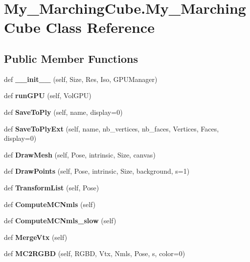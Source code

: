 \section{My\+\_\+\+Marching\+Cube.\+My\+\_\+\+Marching\+Cube Class Reference}
\label{class_my___marching_cube_1_1_my___marching_cube}
\subsection*{Public Member Functions}
\begin{DoxyCompactItemize}
\item 
def \textbf{ \+\_\+\+\_\+init\+\_\+\+\_\+} (self, Size, Res, Iso, G\+P\+U\+Manager)
\item 
def \textbf{ run\+G\+PU} (self, Vol\+G\+PU)
\item 
def \textbf{ Save\+To\+Ply} (self, name, display=0)
\item 
def \textbf{ Save\+To\+Ply\+Ext} (self, name, nb\+\_\+vertices, nb\+\_\+faces, Vertices, Faces, display=0)
\item 
def \textbf{ Draw\+Mesh} (self, Pose, intrinsic, Size, canvas)
\item 
def \textbf{ Draw\+Points} (self, Pose, intrinsic, Size, background, s=1)
\item 
def \textbf{ Transform\+List} (self, Pose)
\item 
def \textbf{ Compute\+M\+C\+Nmls} (self)
\item 
def \textbf{ Compute\+M\+C\+Nmls\+\_\+slow} (self)
\item 
def \textbf{ Merge\+Vtx} (self)
\item 
def \textbf{ M\+C2\+R\+G\+BD} (self, R\+G\+BD, Vtx, Nmls, Pose, s, color=0)
\end{DoxyCompactItemize}
